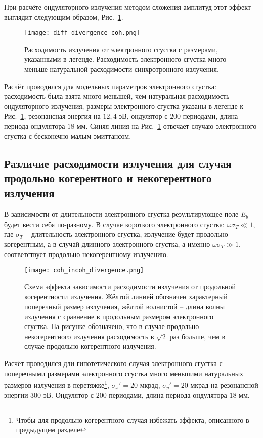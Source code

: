 При расчёте ондуляторного излучения методом сложения амплитуд этот эффект выглядит следующим образом, Рис.~\ref{fig:pic_diff_divergence_coh_scheme}.
\begin{figure}[H] 
	\centering 	\texttt{[image: diff\_divergence\_coh.png]}
	\caption{Расходимость излучения от электронного сгустка с размерами, указанными в легенде. Расходимость электронного сгустка много меньше натуральной расходимости синхротронного излучения.}
	\label{fig:pic_diff_divergence_coh_scheme}
\end{figure}
Расчёт проводился для модельных параметров электронного сгустка: расходимость была взята много меньшей, чем натуральная расходимость ондуляторного излучения, размеры электронного сгустка указаны в легенде к Рис.~\ref{fig:pic_diff_divergence_coh_scheme}, резонансная энергия на $12,4$ эВ, ондулятор с $200$ периодами, длина периода ондулятора $18$ мм. Синяя линия на Рис.~\ref{fig:pic_diff_divergence_coh_scheme} отвечает случаю электронного сгустка с бесконечно малым эмиттансом.

\subsection{Различие расходимости излучения для случая продольно когерентного и некогерентного излучения}
В зависимости от длительности электронного сгустка результирующее поле $\bar{E}_{b}$ будет вести себя по-разному. В случае короткого электронного сгустка: $\omega \sigma_T \ll 1$, где $\sigma_T$ -- длительность электронного сгустка, излучение будет продольно когерентным, а в случай длинного электронного сгустка, а именно  $\omega \sigma_T \gg 1$, соответствует продольно некогерентному излучению. 

\begin{figure}[H] 
	\centering 	\texttt{[image: coh\_incoh\_divergence.png]}
	\caption{Схема эффекта зависимости расходимости излучения от продольной когерентности излучения. Жёлтой линией обозначен характерный поперечный размер излучения, жёлтой волнистой -- длина волны излучения с сравнение в продольным размером электронного сгустка. На рисунке обозначено, что в случае продольно некогерентного излучения расходимость в $\sqrt{2}$ раз больше, чем в случае продольно когерентного излучения.}
	\label{fig:coh_incoh_divergence}
\end{figure}
Расчёт проводился дли гипотетического случая электронного сгустка с поперечными размерами электронного сгустка много меньшими натуральных размеров излучения в перетяжке\footnote{Чтобы для продольно когерентного случая избежать эффекта, описанного в предыдущем разделе}, $\sigma_x' = 20$ мкрад, $\sigma_y' = 20$ мкрад на резонансной энергии $300$ эВ. Ондулятор с $200$ периодами, длина периода ондулятора $18$ мм. 

